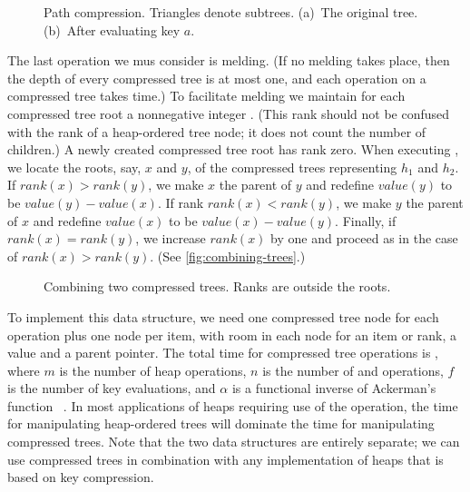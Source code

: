 \begin{figure}
    \caption{Path compression. Triangles denote subtrees. (a)~The original tree.
    (b)~After evaluating key \(a\).}
    \label{fig:path-compression}
\end{figure}

The last operation we mus consider is melding. (If no melding takes place, then the
depth of every compressed tree is at most one, and each operation on a compressed
tree takes  time.) To facilitate melding we maintain for each compressed tree
root a nonnegative integer . (This rank should not be confused with the
rank of a heap-ordered tree node; it does not count the number of children.) A newly
created compressed tree root has rank zero. When executing ,
we locate the roots, say, \(x\) and \(y\), of the compressed trees representing
\(h_1\) and \(h_2\). If \(rank(x) > rank(y)\), we make \(x\) the parent of \(y\) and
redefine \(value(y)\) to be \(value(y) - value(x)\). If rank \(rank(x) < rank(y)\),
we make \(y\) the parent of \(x\) and redefine \(value(x)\) to be \(value(x)
- value(y)\). Finally, if \(rank(x) = rank(y)\), we increase \(rank(x)\) by one and
proceed as in the case of \(rank(x) > rank(y)\). (See \autoref{fig:combining-trees}.)

\begin{figure}
    \caption{Combining two compressed trees. Ranks are outside the roots.}
    \label{fig:combining-trees}
\end{figure}

To implement this data structure, we need one compressed tree node for each
 operation plus one node per item, with room in each node for an item
or rank, a value and a parent pointer. The total time for compressed tree operations
is , where \(m\) is the number of heap operations, \(n\)
is the number of  and  operations, \(f\) is the number of
key evaluations, and \(\alpha\) is a functional inverse of Ackerman's function~%
\cite{Tarjan1979b,TarjanVanLeeuwen1984}. In most applications of heaps requiring use
of the  operation, the time for manipulating heap-ordered trees
will dominate the time for manipulating compressed trees. Note that the two data
structures are entirely separate; we can use compressed trees in combination with any
implementation of heaps that is based on key compression.

